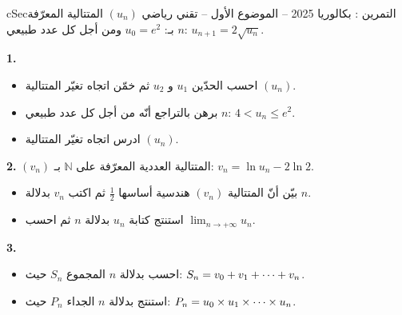 \documentclass[12pt,a4paper]{article}
\newenvironment{BOX}[2]{\begin{otherlanguage}{english}\begin{arbox}{#1}{#2}}{\end{arbox}\end{otherlanguage}}
\newcounter{exo}
\newenvironment{tamrin}[1]{\stepcounter{exo}\begin{BOX}{cSec}{التمرين \theexo: #1}}{\end{BOX}}
\renewcommand{\cdots}{\mathinner{\cdotp\cdotp\cdotp}}
\newcommand{\N}{\mathbb{N}}
\newcommand{\limn}{\displaystyle\lim_{n\to+\infty}}
\newenvironment{sq}{\begin{itemize}[leftmargin=2.4em,itemsep=3pt]}{\end{itemize}}
\newcommand{\qa}{\item[(أ)]}\newcommand{\qb}{\item[(ب)]}\newcommand{\qc}{\item[(جـ)]}\newcommand{\qd}{\item[(د)]}\newcommand{\qe}{\item[(هـ)]}
\begin{document}
\begin{tamrin}{بكالوريا 2025 -- الموضوع الأول -- تقني رياضي}
$(u_n)$ المتتالية المعرّفة بـ: $u_0=e^2$ ومن أجل كل عدد طبيعي $n$: $u_{n+1}=2\sqrt{u_n}$.

\textbf{1.}
\begin{sq}
\qa احسب الحدّين $u_1$ و $u_2$ ثم خمّن اتجاه تغيّر المتتالية $(u_n)$.
\qb برهن بالتراجع أنّه من أجل كل عدد طبيعي $n$: $4<u_n\le e^2$.
\qc ادرس اتجاه تغيّر المتتالية $(u_n)$.
\end{sq}
\textbf{2.} $(v_n)$ المتتالية العددية المعرّفة على $\N$ بـ: $v_n=\ln u_n-2\ln 2$.
\begin{sq}
\qa بيّن أنّ المتتالية $(v_n)$ هندسية أساسها $\frac12$ ثم اكتب $v_n$ بدلالة $n$.
\qb استنتج كتابة $u_n$ بدلالة $n$ ثم احسب $\limn u_n$.
\end{sq}
\textbf{3.}
\begin{sq}
\qa احسب بدلالة $n$ المجموع $S_n$ حيث: $S_n=v_0+v_1+\cdots+v_n$.
\qb استنتج بدلالة $n$ الجداء $P_n$ حيث: $P_n=u_0\times u_1\times\cdots\times u_n$.
\end{sq}
\end{tamrin}
\end{document}
